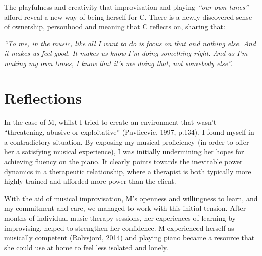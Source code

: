 \documentclass[authordate, empirical]{jote-new-article}
\begin{document}
The playfulness and creativity that improvisation and playing \emph{“our own tunes”} afford reveal a new way of being herself for C. There is a newly discovered sense of ownership, personhood and meaning that C reflects on, sharing that:







{\emph{“To me, in the music, like all I want to do is focus on that and nothing else. And it makes us feel good. It makes us know I'm doing something right. And as I'm making my own tunes, I know that it's me doing that, not somebody else”. }}











\section{Reflections}







In the case of M, whilst I tried to create an environment that wasn't “threatening, abusive or exploitative” (Pavlicevic, 1997, p.134), I found myself in a contradictory situation. By exposing my musical proficiency (in order to offer her a satisfying musical experience), I was initially undermining her hopes for achieving fluency on the piano. It clearly points towards the inevitable power dynamics in a therapeutic relationship, where a therapist is both typically more highly trained and afforded more power than the client.







With the aid of musical improvisation, M's openness and willingness to learn, and my commitment and care, we managed to work with this initial tension. After months of individual music therapy sessions, her experiences of learning-by-improvising, helped to strengthen her confidence. M experienced herself as musically competent (Rolvsjord, 2014) and playing piano became a resource that she could use at home to feel less isolated and lonely.
\end{document}
